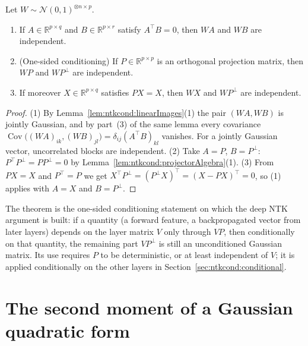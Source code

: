 \begin{theorem}\label{thm:ntkcond:lemma226}
  \leanok
Let $W\sim\mathcal N(0,1)^{\otimes n\times p}$.
\begin{enumerate}
  \item If $A\in\mathbb R^{p\times q}$ and $B\in\mathbb R^{p\times r}$ satisfy $A^\top B=0$, then $WA$ and $WB$ are independent.
  \item (One-sided conditioning) If $P\in\mathbb R^{p\times p}$ is an orthogonal projection matrix, then $WP$ and $WP^\perp$ are independent.
  \item If moreover $X\in\mathbb R^{p\times q}$ satisfies $PX=X$, then $WX$ and $WP^\perp$ are independent.
\end{enumerate}
\end{theorem}

\begin{proof}
  \leanok
(1) By Lemma~\ref{lem:ntkcond:linearImages}(1) the pair $(WA,WB)$ is jointly Gaussian, and by part~(3) of the same lemma every covariance $\operatorname{Cov}\bigl((WA)_{ik},(WB)_{jl}\bigr)=\delta_{ij}(A^\top B)_{kl}$ vanishes. For a jointly Gaussian vector, uncorrelated blocks are independent.
(2) Take $A=P$, $B=P^\perp$: $P^\top P^\perp=PP^\perp=0$ by Lemma~\ref{lem:ntkcond:projectorAlgebra}(1).
(3) From $PX=X$ and $P^\top=P$ we get $X^\top P^\perp=(P^\perp X)^\top=(X-PX)^\top=0$, so (1) applies with $A=X$ and $B=P^\perp$.
\end{proof}

The theorem is the one-sided conditioning statement on which the deep NTK argument is built: if a quantity (a forward feature, a backpropagated vector from later layers) depends on the layer matrix $V$ only through $VP$, then conditionally on that quantity, the remaining part $VP^\perp$ is still an unconditioned Gaussian matrix. Its use requires $P$ to be deterministic, or at least independent of $V$; it is applied conditionally on the other layers in Section~\ref{sec:ntkcond:conditional}.


\section{The second moment of a Gaussian quadratic form}\label{sec:ntkcond:quadVariance}

